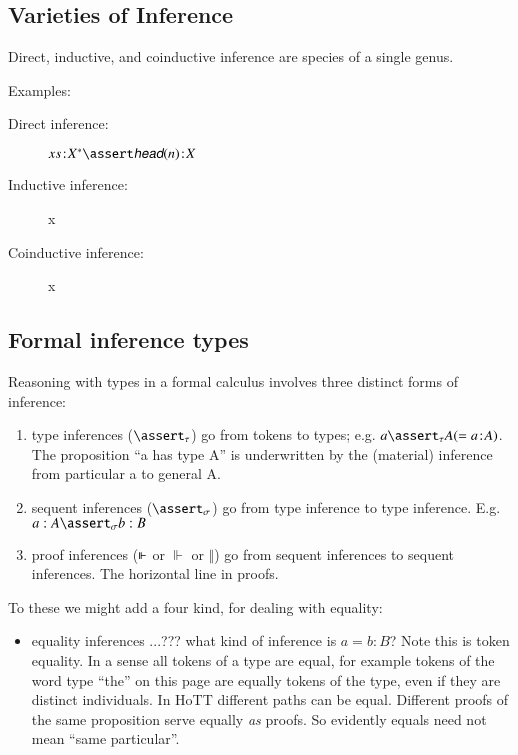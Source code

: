 \documentclass{article}
\begin{document}
\subsection{Varieties of Inference}

Direct, inductive, and coinductive inference are species of a single
genus.

Examples:

\begin{description}
\item[Direct inference:]  \(\tj{\seq{x}}{\List{X}}\linfer \tj{\head(n)}{X}\)
\item[Inductive inference:] x
\item[Coinductive inference:] x
\end{description}

\subsection{Formal inference types}

Reasoning with types in a formal calculus involves three distinct
forms of inference:

\begin{enumerate}
\item type inferences (\(\tinfer\)) go from tokens to types; e.g. \(a\tinfer
  A (= \mbox{\tj{a}{A}})\). The proposition ``a has type A'' is underwritten by the
  (material) inference from particular a to general A.
\item sequent inferences (\(\sso\)) go from type inference to type inference.  E.g. \(a:A\sso b:B\)
\item proof inferences (\(\Vdash\) or \(\Vdash\) or  \(\Vert\)) go
  from sequent inferences to sequent inferences. The horizontal line
  in proofs.
\end{enumerate}

To these we might add a four kind, for dealing with equality:

\begin{itemize}
\item equality inferences ...??? what kind of inference is \(a=b:B\)?
  Note this is token equality. In a sense all tokens of a type are
  equal, for example tokens of the word type ``the'' on this page are
  equally tokens of the type, even if they are distinct individuals.
  In HoTT different paths can be equal. Different proofs of the same
  proposition serve equally \textit{as} proofs. So evidently equals
  need not mean ``same particular''.
\end{itemize}
\end{document}
